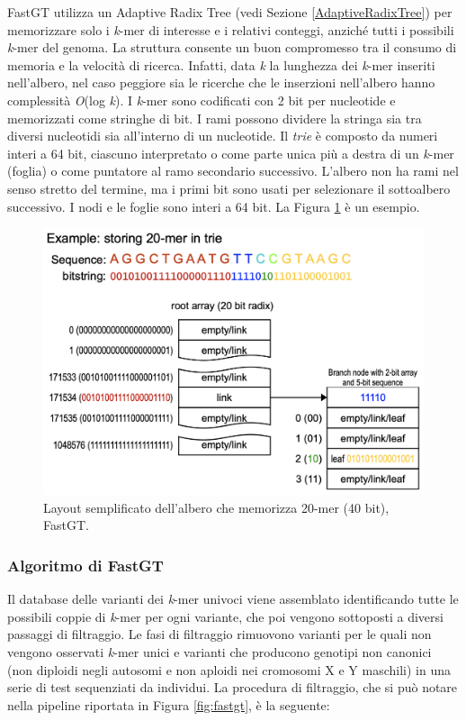 \documentclass[../main.tex]{subfiles}
\begin{document}
\noindent
FastGT utilizza un Adaptive Radix Tree (vedi Sezione \ref{AdaptiveRadixTree}) per memorizzare solo i \textit{k}-mer di interesse e i relativi conteggi, anziché tutti i possibili \textit{k}-mer del genoma. La struttura consente un buon compromesso tra il consumo di memoria e la velocità di ricerca. Infatti, data \textit{k} la lunghezza dei \textit{k}-mer inseriti nell'albero, nel caso peggiore sia le ricerche che le inserzioni nell'albero hanno complessità \textit{O}(log \textit{k}). I \textit{k}-mer sono codificati con 2 bit per nucleotide e memorizzati come stringhe di bit. I rami possono dividere la stringa sia tra diversi nucleotidi sia all'interno di un nucleotide. Il \textit{trie} è composto da numeri interi a 64 bit, ciascuno interpretato o come parte unica più a destra di un \textit{k}-mer (foglia) o come puntatore al ramo secondario successivo. L'albero non ha rami nel senso stretto del termine, ma i primi bit sono usati per selezionare il sottoalbero successivo. I nodi e le foglie sono interi a 64 bit. La Figura \ref{fig:art} è un esempio.

\begin{figure}[h!]
	\centering
  	\captionsetup{justification=centering}
  	\includegraphics[scale=.35]{images/fastgt-art.png}
  	\caption{Layout semplificato dell'albero che memorizza 20-mer (40 bit), FastGT.}
  	\label{fig:art}
\end{figure}


\subsubsection{Algoritmo di FastGT}

Il database delle varianti dei \textit{k}-mer univoci viene assemblato identificando tutte le possibili coppie di \textit{k}-mer per ogni variante, che poi vengono sottoposti a diversi passaggi di filtraggio. Le fasi di filtraggio rimuovono varianti per le quali non vengono osservati \textit{k}-mer unici e varianti che producono genotipi non canonici (non diploidi negli autosomi e non aploidi nei cromosomi X e Y maschili) in una serie di test sequenziati da individui. La procedura di filtraggio, che si può notare nella pipeline riportata in Figura \ref{fig:fastgt}, è la seguente:
\end{document}
